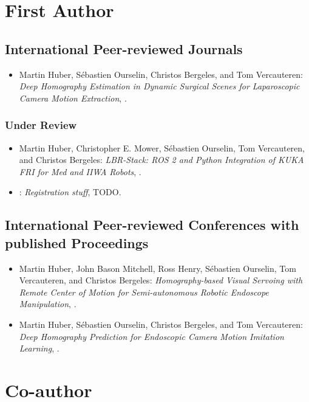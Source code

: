 \section{First Author}

\subsection{International Peer-reviewed Journals}
\begin{itemize}
    \item Martin Huber, S\'{e}bastien Ourselin, Christos Bergeles, and Tom Vercauteren: \textit{Deep Homography Estimation in Dynamic Surgical
Scenes for Laparoscopic Camera Motion Extraction}, \cite{huber2022deep}.
\end{itemize}

\subsubsection{Under Review}
\begin{itemize}
    \item Martin Huber, Christopher E. Mower, S\'{e}bastien Ourselin, Tom Vercauteren, and Christos Bergeles: \textit{LBR-Stack: ROS 2 and Python Integration of KUKA FRI for Med and
IIWA Robots}, \cite{huber2023lbr}.
    \item : \textit{Registration stuff}, TODO.
\end{itemize}

\subsection{International Peer-reviewed Conferences with published Proceedings}
\begin{itemize}
    \item Martin Huber, John Bason Mitchell, Ross Henry, S\'{e}bastien Ourselin, Tom Vercauteren, and Christos Bergeles: \textit{Homography-based Visual Servoing with Remote Center of Motion for Semi-autonomous Robotic Endoscope Manipulation}, \cite{huber2021homographybased}.
    \item Martin Huber, S\'{e}bastien Ourselin, Christos Bergeles, and Tom Vercauteren: \textit{Deep Homography Prediction for Endoscopic Camera Motion Imitation Learning}, \cite{huber2023deep}.
\end{itemize}

\section{Co-author}
